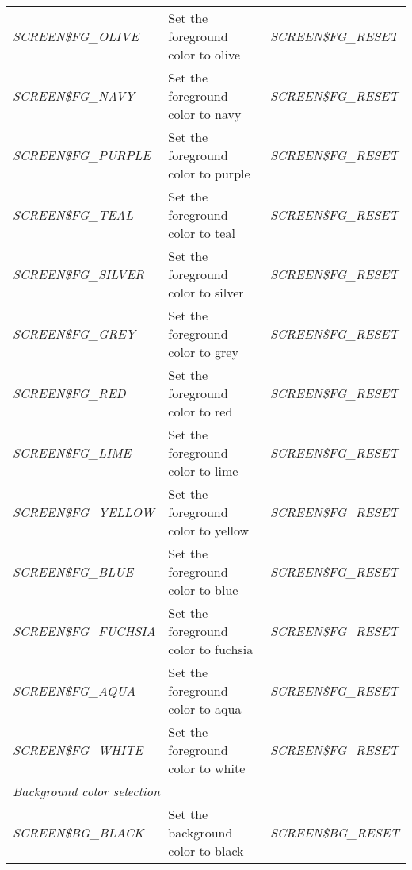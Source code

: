 \documentclass[a4paper]{book}
\begin{document}
\begin{table}[h!tb]
\begin{minipage}[h!tb]{\textwidth}
\begin{tabular}{lp{60mm}l}
\scriptsize{\textsl{SCREEN{\$}FG{\_}OLIVE}  }           & Set the foreground color to olive   & \scriptsize{\textsl{SCREEN{\$}FG{\_}RESET}} \\
\scriptsize{\textsl{SCREEN{\$}FG{\_}NAVY}   }           & Set the foreground color to navy    & \scriptsize{\textsl{SCREEN{\$}FG{\_}RESET}} \\
\scriptsize{\textsl{SCREEN{\$}FG{\_}PURPLE} }           & Set the foreground color to purple  & \scriptsize{\textsl{SCREEN{\$}FG{\_}RESET}} \\
\scriptsize{\textsl{SCREEN{\$}FG{\_}TEAL}   }           & Set the foreground color to teal    & \scriptsize{\textsl{SCREEN{\$}FG{\_}RESET}} \\
\scriptsize{\textsl{SCREEN{\$}FG{\_}SILVER} }           & Set the foreground color to silver  & \scriptsize{\textsl{SCREEN{\$}FG{\_}RESET}} \\
\scriptsize{\textsl{SCREEN{\$}FG{\_}GREY}   }           & Set the foreground color to grey    & \scriptsize{\textsl{SCREEN{\$}FG{\_}RESET}} \\
\scriptsize{\textsl{SCREEN{\$}FG{\_}RED}    }           & Set the foreground color to red	  & \scriptsize{\textsl{SCREEN{\$}FG{\_}RESET}} \\
\scriptsize{\textsl{SCREEN{\$}FG{\_}LIME}   }           & Set the foreground color to lime    & \scriptsize{\textsl{SCREEN{\$}FG{\_}RESET}} \\
\scriptsize{\textsl{SCREEN{\$}FG{\_}YELLOW} }           & Set the foreground color to yellow  & \scriptsize{\textsl{SCREEN{\$}FG{\_}RESET}} \\
\scriptsize{\textsl{SCREEN{\$}FG{\_}BLUE}   }           & Set the foreground color to blue    & \scriptsize{\textsl{SCREEN{\$}FG{\_}RESET}} \\
\scriptsize{\textsl{SCREEN{\$}FG{\_}FUCHSIA}}           & Set the foreground color to fuchsia & \scriptsize{\textsl{SCREEN{\$}FG{\_}RESET}} \\
\scriptsize{\textsl{SCREEN{\$}FG{\_}AQUA}   }           & Set the foreground color to aqua    & \scriptsize{\textsl{SCREEN{\$}FG{\_}RESET}} \\
\scriptsize{\textsl{SCREEN{\$}FG{\_}WHITE}  }           & Set the foreground color to white   & \scriptsize{\textsl{SCREEN{\$}FG{\_}RESET}} \\
\hline\multicolumn{3}{l}{\textit{Background color selection}} \\ \hline
\scriptsize{\textsl{SCREEN{\$}BG{\_}BLACK}  }           & Set the background color to black   & \scriptsize{\textsl{SCREEN{\$}BG{\_}RESET}} \\

\end{tabular}
\end{minipage}
\end{table}
\end{document}

